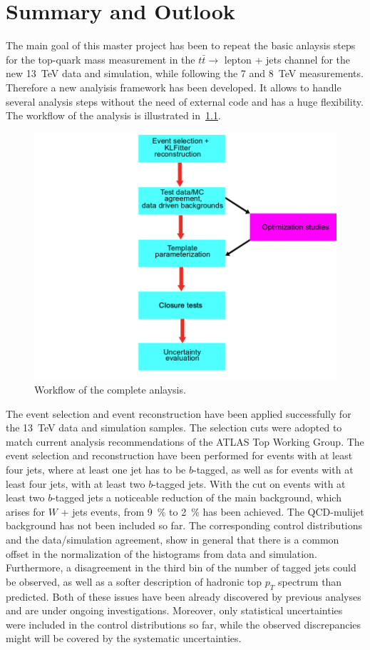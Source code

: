 \chapter{Summary and Outlook}
\label{sec:sum}

The main goal of this master project has been to repeat the basic anlaysis steps for the top-quark mass measurement in the $t\bar{t} \rightarrow $ lepton + jets channel for the new 13~TeV data and simulation, while following the  7 and 8~TeV measurements. Therefore a new analyisis framework has been developed. It allows to handle several analysis steps without the need of external code and has a huge flexibility. The workflow of the analysis is illustrated in~\cref{fig:Workflow}.

\begin{figure}
	\center
	\includegraphics[width=0.6\linewidth]{Pics/Workflow}
	\caption{Workflow of the complete anlaysis.} \label{fig:Workflow}
\end{figure}

 The event selection and event reconstruction have been applied successfully for the 13~TeV data and simulation samples. The selection cuts were adopted to match current analysis recommendations of the ATLAS Top Working Group. The event selection and reconstruction have been performed for events with at least four jets, where at least one jet has to be $b$-tagged, as well as for events with at least four jets, with  at least two $b$-tagged jets.  With the cut on events with at least two $b$-tagged jets a noticeable reduction of the main background, which arises for $W$  + jets events, from 9~\% to 2~\% has been  achieved. The QCD-mulijet background has not been included so far. The corresponding control distributions and  the data/simulation agreement, show in general that there is a common offset in the normalization of the histograms from data and simulation. Furthermore, a disagreement  in the third bin of the number of tagged jets could be observed, as well as a softer description of hadronic top $p_T$ spectrum than predicted. Both of these issues have been already discovered by previous analyses and are under ongoing investigations. Moreover, only statistical uncertainties were included in the control distributions so far, while the observed discrepancies might will be covered by the systematic uncertainties.
 

